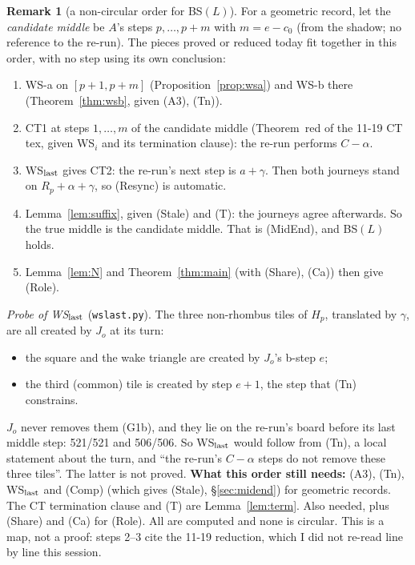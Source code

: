 \documentclass[11pt]{article}
\theoremstyle{definition}\newtheorem{definition}[theorem]{Definition}\newtheorem{remark}[theorem]{Remark}
\begin{document}
\begin{remark}[a non-circular order for BS$(L)$]\label{rem:order}
For a geometric record, let the \emph{candidate middle} be $A$'s steps $p,\dots,p+m$ with $m=e-c_0$ (from the shadow; no reference to the re-run). The pieces proved or reduced today fit together in this order, with no step using its own conclusion:
\begin{enumerate}
\item WS-a on $[p+1,p+m]$ (Proposition~\ref{prop:wsa}) and WS-b there (Theorem~\ref{thm:wsb}, given (A3), (Tn)).
\item CT1 at steps $1,\dots,m$ of the candidate middle (Theorem~red of the 11-19 CT tex, given WS$_i$ and its termination clause): the re-run performs $C-\alpha$.
\item WS$_{\rm last}$ gives CT2: the re-run's next step is $a+\gamma$. Then both journeys stand on $R_p+\alpha+\gamma$, so (Resync) is automatic.
\item Lemma~\ref{lem:suffix}, given (Stale) and (T): the journeys agree afterwards. So the true middle is the candidate middle. That is (MidEnd), and BS$(L)$ holds.
\item Lemma~\ref{lem:N} and Theorem~\ref{thm:main} (with (Share), (Ca)) then give (Role).
\end{enumerate}
\emph{Probe of WS$_{\rm last}$} (\texttt{wslast.py}). The three non-rhombus tiles of $H_p$, translated by $\gamma$, are all created by $J_o$ at its turn:
\begin{itemize}
\item the square and the wake triangle are created by $J_o$'s b-step $e$;
\item the third (common) tile is created by step $e+1$, the step that (Tn) constrains.
\end{itemize}
$J_o$ never removes them (G1b), and they lie on the re-run's board before its last middle step: 521/521 and 506/506. So WS$_{\rm last}$ would follow from (Tn), a local statement about the turn, and ``the re-run's $C-\alpha$ steps do not remove these three tiles''. The latter is not proved.
\textbf{What this order still needs:} (A3), (Tn), WS$_{\rm last}$ and (Comp) (which gives (Stale), \S\ref{sec:midend}) for geometric records. The CT termination clause and (T) are Lemma~\ref{lem:term}. Also needed, plus (Share) and (Ca) for (Role). All are computed and none is circular. This is a map, not a proof: steps 2--3 cite the 11-19 reduction, which I did not re-read line by line this session.
\end{remark}
\end{document}
